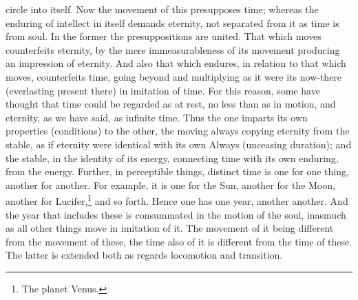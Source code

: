 \documentclass[12pt]{article}
\begin{document}
circle into itself. Now the movement of this presupposes time; whereas the enduring of intellect in itself demands eternity, not separated from it as time is from soul. In the former the presuppositions are united. That which moves counterfeits eternity, by the mere immeasurableness of its movement producing an impression of eternity. And also that which endures, in relation to that which moves, counterfeits time, going beyond and multiplying as it were its now-there (everlasting present there) in imitation of time. For this reason, some have thought that time could be regarded as at rest, no less than as in motion, and eternity, as we have said, as infinite time. Thus the one imparts its own properties (conditions) to the other, the moving always copying eternity from the stable, as if eternity were identical with its own Always (unceasing duration); and the stable, in the identity of its energy, connecting time with its own enduring, from the energy. Further, in perceptible things, distinct time is one for one thing, another for another. For example, it is one for the Sun, another for the Moon, another for Lucifer,\footnote{The planet Venus.} and so forth. Hence one has one year, another another. And the year that includes these is consummated in the motion of the soul, inasmuch as all other things move in imitation of it. The movement of it being different from the movement of these, the time also of it is different from the time of these. The latter is extended both as regards locomotion and transition.
\end{document}
